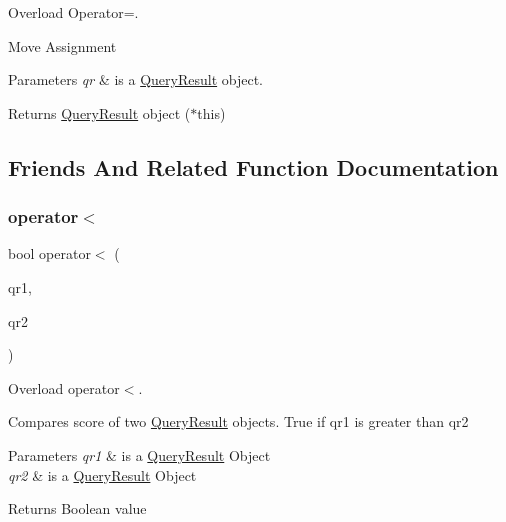 Overload Operator=. 

Move Assignment


\begin{DoxyParams}{Parameters}
{\em qr} & is a \hyperlink{class_query_result}{Query\+Result} object. \\
\hline
\end{DoxyParams}
\begin{DoxyReturn}{Returns}
\hyperlink{class_query_result}{Query\+Result} object ($\ast$this) 
\end{DoxyReturn}


\subsection{Friends And Related Function Documentation}
\mbox{\label{class_query_result_a818370d36ae89f51264a7701543884bd}} 
\subsubsection{\texorpdfstring{operator$<$}{operator<}}
{\footnotesize\ttfamily bool operator$<$ (\begin{DoxyParamCaption}\item[{const \hyperlink{class_query_result}{Query\+Result} \&}]{qr1,  }\item[{const \hyperlink{class_query_result}{Query\+Result} \&}]{qr2 }\end{DoxyParamCaption})\hspace{0.3cm}{\ttfamily [friend]}}



Overload operator$<$. 

Compares score of two \hyperlink{class_query_result}{Query\+Result} objects. True if qr1 is greater than qr2


\begin{DoxyParams}{Parameters}
{\em qr1} & is a \hyperlink{class_query_result}{Query\+Result} Object \\
\hline
{\em qr2} & is a \hyperlink{class_query_result}{Query\+Result} Object \\
\hline
\end{DoxyParams}
\begin{DoxyReturn}{Returns}
Boolean value 
\end{DoxyReturn}
\mbox{\label{class_query_result_a860145488e9a3cd6c7df13816dd3f78e}} 

